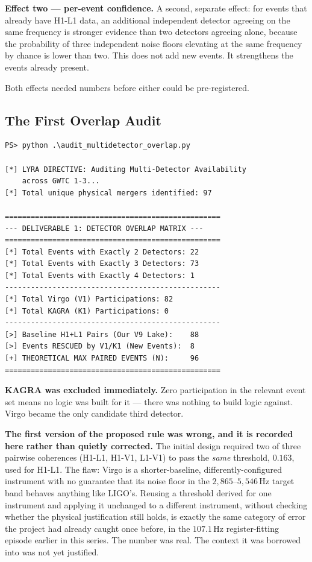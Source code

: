 \documentclass[11pt, letterpaper, openany]{book}
\begin{document}
\textbf{Effect two --- per-event confidence.} A second, separate effect:
for events that already have H1-L1 data, an additional independent
detector agreeing on the same frequency is stronger evidence than two
detectors agreeing alone, because the probability of three independent
noise floors elevating at the same frequency by chance is lower than two.
This does not add new events. It strengthens the events already present.

Both effects needed numbers before either could be pre-registered.

\subsection*{The First Overlap Audit}

\begin{lstlisting}[style=terminal]
PS> python .\audit_multidetector_overlap.py

[*] LYRA DIRECTIVE: Auditing Multi-Detector Availability
    across GWTC 1-3...
[*] Total unique physical mergers identified: 97

==================================================
--- DELIVERABLE 1: DETECTOR OVERLAP MATRIX ---
==================================================
[*] Total Events with Exactly 2 Detectors: 22
[*] Total Events with Exactly 3 Detectors: 73
[*] Total Events with Exactly 4 Detectors: 1
--------------------------------------------------
[*] Total Virgo (V1) Participations: 82
[*] Total KAGRA (K1) Participations: 0
--------------------------------------------------
[>] Baseline H1+L1 Pairs (Our V9 Lake):    88
[>] Events RESCUED by V1/K1 (New Events):  8
[+] THEORETICAL MAX PAIRED EVENTS (N):     96
==================================================
\end{lstlisting}

\textbf{KAGRA was excluded immediately.} Zero participation in the
relevant event set means no logic was built for it --- there was nothing
to build logic against. Virgo became the only candidate third detector.

\textbf{The first version of the proposed rule was wrong, and it is
recorded here rather than quietly corrected.} The initial design
required two of three pairwise coherences (H1-L1, H1-V1, L1-V1) to pass
the \emph{same} threshold, $0.163$, used for H1-L1. The flaw: Virgo is a
shorter-baseline, differently-configured instrument with no guarantee
that its noise floor in the $2{,}865$--$5{,}546$\,Hz target band behaves
anything like LIGO's. Reusing a threshold derived for one instrument and
applying it unchanged to a different instrument, without checking whether
the physical justification still holds, is exactly the same category of
error the project had already caught once before, in the $107.1$\,Hz
register-fitting episode earlier in this series. The number was real. The
context it was borrowed into was not yet justified.
\end{document}
